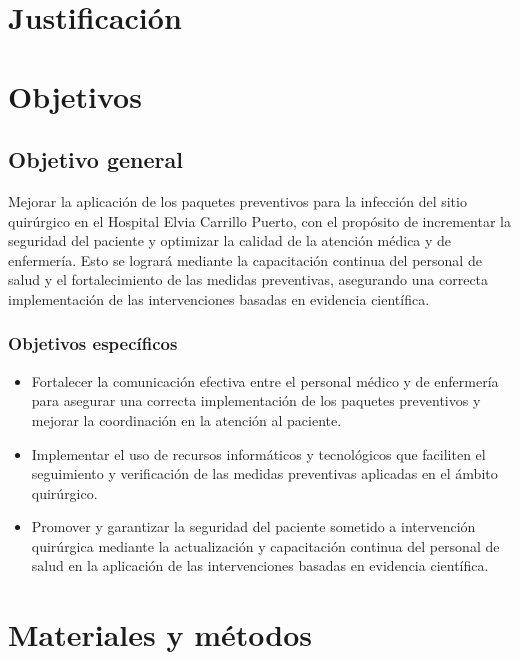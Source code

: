 \documentclass[12 pt]{report}
\begin{document}
	\section*{Justificación} 
	\section*{Objetivos} 
	
	\subsection*{Objetivo general} 
Mejorar la aplicación de los paquetes preventivos para la infección del sitio quirúrgico en el Hospital Elvia Carrillo Puerto, con el propósito de incrementar la seguridad del paciente y optimizar la calidad de la atención médica y de enfermería. Esto se logrará mediante la capacitación continua del personal de salud y el fortalecimiento de las medidas preventivas, asegurando una correcta implementación de las intervenciones basadas en evidencia científica.
	
	\subsubsection*{Objetivos específicos} 
	\begin{itemize}
		\item Fortalecer la comunicación efectiva entre el personal médico y de enfermería para asegurar una correcta implementación de los paquetes preventivos y mejorar la coordinación en la atención al paciente.
		\item Implementar el uso de recursos informáticos y tecnológicos que faciliten el seguimiento y verificación de las medidas preventivas aplicadas en el ámbito quirúrgico.
		\item Promover y garantizar la seguridad del paciente sometido a intervención quirúrgica mediante la actualización y capacitación continua del personal de salud en la aplicación de las intervenciones basadas en evidencia científica.	
	\end{itemize}
	
	\section*{Materiales y métodos} 
	
\end{document}
